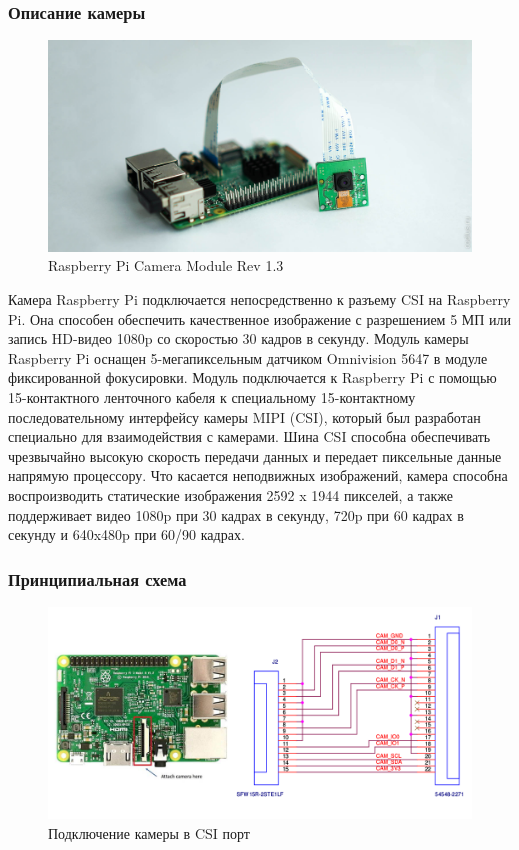 \documentclass[a4paper,11pt]{article}
\begin{document}
\subsubsection{Описание камеры}
\begin{center}
  \begin{figure}[h]
    \includegraphics[scale=0.8]{images/pic_3.jpg}
    \caption{Raspberry Pi Camera Module Rev 1.3}
  \end{figure}
\end{center}
\noindent Камера Raspberry Pi подключается непосредственно к разъему CSI на Raspberry Pi. Она способен обеспечить качественное изображение с разрешением 5 МП или запись HD-видео 1080p со скоростью 30 кадров в секунду. Модуль камеры Raspberry Pi оснащен 5-мегапиксельным датчиком Omnivision 5647 в модуле фиксированной фокусировки. Модуль подключается к Raspberry Pi с помощью 15-контактного ленточного кабеля к специальному 15-контактному последовательному интерфейсу камеры MIPI (CSI), который был разработан специально для взаимодействия с камерами. Шина CSI способна обеспечивать чрезвычайно высокую скорость передачи данных и передает пиксельные данные напрямую процессору. Что касается неподвижных изображений, камера способна воспроизводить статические изображения 2592 x 1944 пикселей, а также поддерживает видео 1080p при 30 кадрах в секунду, 720p при 60 кадрах в секунду и 640x480p при 60/90 кадрах.\\

\subsubsection{Принципиальная схема}
\begin{center}
  \begin{figure}[h]
    \includegraphics[scale=0.5]{images/pic_7.png}
    \caption{Подключение камеры в CSI порт}
  \end{figure}
\end{center}
\end{document}
